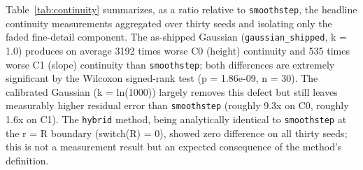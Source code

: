 Table~\ref{tab:continuity} summarizes, as a ratio relative to \texttt{smoothstep}, the headline continuity measurements aggregated over thirty seeds and isolating only the faded fine-detail component. The as-shipped Gaussian (\texttt{gaussian\_shipped}, k = 1.0) produces on average 3192 times worse C0 (height) continuity and 535 times worse C1 (slope) continuity than \texttt{smoothstep}; both differences are extremely significant by the Wilcoxon signed-rank test (p = 1.86e-09, n = 30). The calibrated Gaussian (k = ln(1000)) largely removes this defect but still leaves measurably higher residual error than \texttt{smoothstep} (roughly 9.3x on C0, roughly 1.6x on C1). The \texttt{hybrid} method, being analytically identical to \texttt{smoothstep} at the r = R boundary (switch(R) = 0), showed zero difference on all thirty seeds; this is not a measurement result but an expected consequence of the method's definition.
